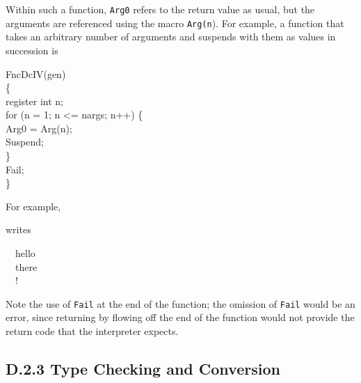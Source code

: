 Within such a function, \texttt{Arg0} refers to the return value as usual, but
the arguments are referenced using the macro \texttt{Arg(n}). For example, a
function that takes an arbitrary number of arguments and suspends with
them as values in succession is

\goodbreak
\begin{iconcode}
FncDcIV(gen)\\
\{\\
\>register int n;\\
\>for (n = 1; n <= nargs; n++) \{\\
\>\>Arg0 = Arg(n);\\
\>\>Suspend;\\
\>\}\\
\>Fail;\\
\}
\end{iconcode}

\noindent
For example,

\noindent
writes

\goodbreak
\begin{iconcode}
\ \ hello\\
\ \ there\\
\ \ !
\end{iconcode}

\noindent
Note the use of \texttt{Fail} at the end of the function; the omission of
\texttt{Fail} would be an error, since returning by flowing off the end of the
function would not provide the return code that the interpreter expects.

\subsection[D.2.3 Type Checking and Conversion]{D.2.3 Type Checking and Conversion}

